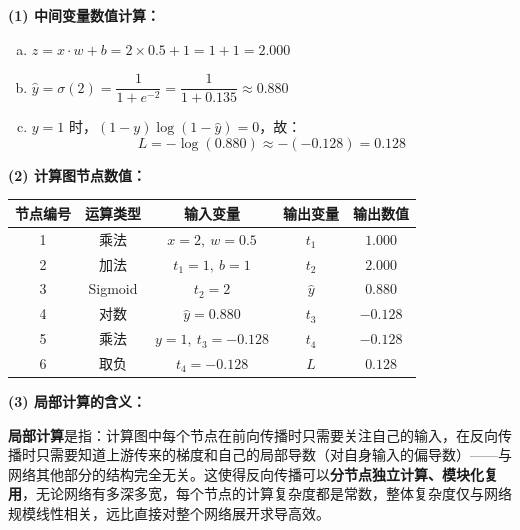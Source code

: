 \documentclass[a4paper,11pt]{ctexart}
\begin{document}
\begin{solutionbox}[参考答案与详细解析]
    \textbf{(1) 中间变量数值计算：}

    \begin{enumerate}[a.]
        \item $z = x \cdot w + b = 2 \times 0.5 + 1 = 1 + 1 = \boxed{2.000}$
        \item $\hat{y} = \sigma(2) = \dfrac{1}{1+e^{-2}} = \dfrac{1}{1+0.135} \approx \boxed{0.880}$
        \item $y=1$ 时，$(1-y)\log(1-\hat{y}) = 0$，故：
        \[
        L = -\log(0.880) \approx -(-0.128) = \boxed{0.128}
        \]
    \end{enumerate}

    \textbf{(2) 计算图节点数值：}

    \begin{center}
    \begin{tabular}{ccccc}
        \toprule
        节点编号 & 运算类型 & 输入变量 & 输出变量 & 输出数值 \\
        \midrule
        1 & 乘法 & $x=2,\ w=0.5$ & $t_1$ & $1.000$ \\
        2 & 加法 & $t_1=1,\ b=1$ & $t_2$ & $2.000$ \\
        3 & Sigmoid & $t_2=2$ & $\hat{y}$ & $0.880$ \\
        4 & 对数 & $\hat{y}=0.880$ & $t_3$ & $-0.128$ \\
        5 & 乘法 & $y=1,\ t_3=-0.128$ & $t_4$ & $-0.128$ \\
        6 & 取负 & $t_4=-0.128$ & $L$ & $0.128$ \\
        \bottomrule
    \end{tabular}
    \end{center}

    \textbf{(3) 局部计算的含义：}

    \textbf{局部计算}是指：计算图中每个节点在前向传播时只需要关注自己的输入，在反向传播时只需要知道上游传来的梯度和自己的局部导数（对自身输入的偏导数）——与网络其他部分的结构完全无关。这使得反向传播可以\textbf{分节点独立计算、模块化复用}，无论网络有多深多宽，每个节点的计算复杂度都是常数，整体复杂度仅与网络规模线性相关，远比直接对整个网络展开求导高效。
\end{solutionbox}
\end{document}
